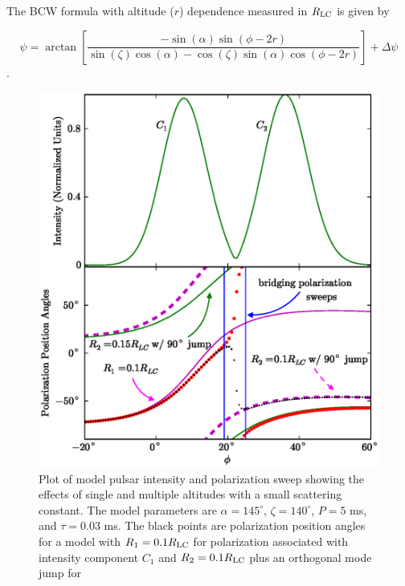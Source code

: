The BCW formula with altitude ($r$) dependence measured in $R_{\rm{LC}}$ is given by

\begin{equation}\label{eq:BCWdeltaPhi}
\psi=\arctan\left[\frac{-\sin(\alpha)\sin(\phi-2r)}
{\sin(\zeta) \cos(\alpha) -\cos(\zeta) \sin(\alpha) \cos(\phi-2r)}\right]+\Delta\psi
\end{equation}
\citep{dyks2008altitude}.

\begin{figure}[htbp]
\begin{center}
\includegraphics[scale=.7]{chapters/applicationOfNumericalModel/figures/intAndPAJexamplealpha145zeta140.eps}
\caption[Plot of model pulsar intensity and polarization sweep showing the effects of single and
multiple altitudes with a small scattering constant]{\label{fig:PlotJexampleintPA}
Plot of model pulsar intensity and polarization sweep showing the effects of single and 
multiple altitudes with a small scattering constant.
The model parameters are $\alpha=145^\circ$, $\zeta=140^\circ$, $P=5$ ms, and $\tau=0.03$ ms.
The black points are polarization position angles for a model with $R_1=0.1R_{\rm{LC}}$ for
polarization associated with intensity component $C_1$ 
and $R_2=0.1R_{\rm{LC}}$ plus an orthogonal mode jump for 
}
\end{center}
\end{figure}
